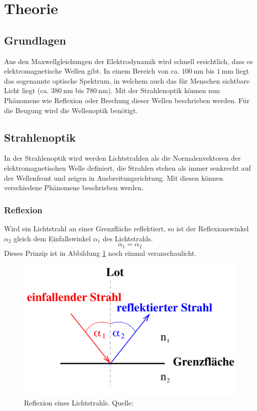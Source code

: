 \section{Theorie}
\label{sec:Theorie}

\subsection{Grundlagen}
\label{sec:grundlagen}
Aus den Maxwellgleichungen der Elektrodynamik wird schnell ersichtlich, dass es elektromagnetische Wellen
gibt. In einem Bereich von ca. $\SI{100}{\nano\metre}$ bis $\SI{1}{\milli\metre}$ liegt das sogenannte
optische Spektrum, in welchem auch das für Menschen sichtbare Licht liegt (ca. $\SI{380}{\nano\metre}$
bis $\SI{780}{\nano\metre}$). Mit der Strahlenoptik \label{sec:strahlen} können nun Phänomene wie Reflexion oder Brechung
dieser Wellen beschrieben werden. Für die Beugung wird die Wellenoptik \label{sec:welle} benötigt.
\subsection{Strahlenoptik}
In der Strahlenoptik wird werden Lichtstrahlen als die Normalenvektoren der elektromagnetischen Welle
definiert, die Strahlen stehen als immer senkrecht auf der Wellenfront und zeigen in Ausbreitungsrichtung.
Mit diesen können verschiedene Phänomene beschrieben werden.

\subsubsection*{Reflexion}
\label{sec:reflexion}
Wird ein Lichtstrahl an einer Grenzfläche reflektiert, so ist der Reflexionswinkel $\alpha_2$ gleich dem
Einfallswinkel $\alpha_1$ des Lichtstrahls.
\begin{equation}
    \alpha_1=\alpha_2
    \label{eqn:reflexion}
\end{equation}
Dieses Prinzip ist in Abbildung \ref{fig:reflexion} noch einmal veranschaulicht.
\begin{figure}[H]
    \centering
    \includegraphics[scale = 0.3]{pictures/Reflexion.png}
    \caption{Reflexion eines Lichtstrahls. Quelle: \cite{AP01}}
    \label{fig:reflexion}
\end{figure}

